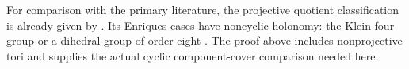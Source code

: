 For comparison with the primary literature, the projective
quotient classification is already given by
\cite[Theorem~2.1 and Lemma~3.4]{Yoshihara1995}.
Its Enriques cases have noncyclic holonomy: the Klein
four group or a dihedral group of order eight
\cite[Example~2.3 and Lemma~3.6]{Yoshihara1995}.
The proof above includes nonprojective tori and supplies
the actual cyclic component-cover comparison needed here.


